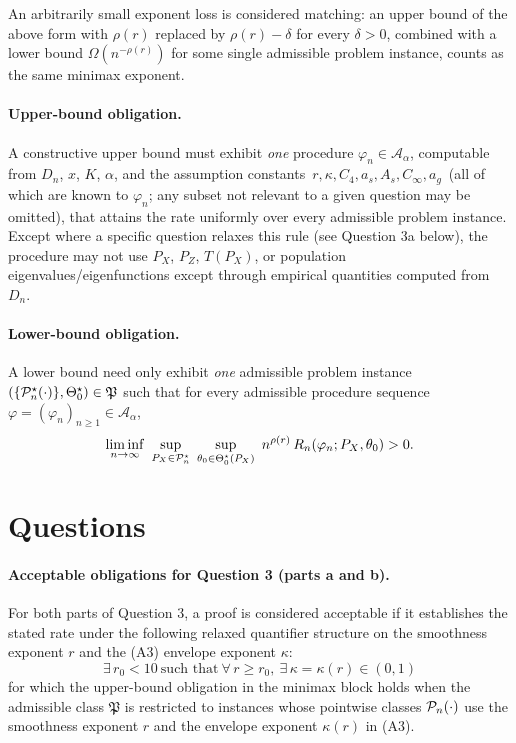 \documentclass{article}
\begin{document}
An arbitrarily small exponent loss is considered matching: an upper
bound of the above form with \(\rho(r)\) replaced by \(\rho(r)-\delta\)
for every \(\delta>0\), combined with a lower bound
\(\Omega(n^{-\rho(r)})\) for some single admissible problem instance,
counts as the same minimax exponent.

\paragraph{Upper-bound obligation.} A constructive upper bound must
exhibit \emph{one} procedure \(\varphi_n\in\mathcal A_\alpha\),
computable from \(D_n\), \(x\), \(K\), \(\alpha\), and the assumption
constants
\(\,r,\kappa,C_4,a_s,A_s,C_\infty,a_g\,\)
(all of which are known to \(\varphi_n\); any subset not relevant to a
given question may be omitted), that attains the rate uniformly over
every admissible problem instance. Except where a specific question
relaxes this rule (see Question 3a below), the procedure may not use
\(P_X\), \(P_Z\), \(T(P_X)\), or population eigenvalues/eigenfunctions
except through empirical quantities computed from \(D_n\).

\paragraph{Lower-bound obligation.} A lower bound need only exhibit
\emph{one} admissible problem instance
\((\{\mathcal P_n^\star(\cdot)\},\Theta_0^\star)\in\mathfrak P\) such that
for every admissible procedure sequence
\(\varphi=(\varphi_n)_{n\ge1}\in\mathcal A_\alpha\),
\[
  \liminf_{n\to\infty}\
  \sup_{P_X\in\mathcal P_n^\star}\
  \sup_{\theta_0\in\Theta_0^\star(P_X)}\
  n^{\rho(r)}\,
  R_n(\varphi_n;P_X,\theta_0)
  >0.
\]

\section{Questions}

\paragraph{Acceptable obligations for Question 3 (parts a and b).}
For both parts of Question 3, a proof is considered acceptable if it
establishes the stated rate under the following relaxed quantifier
structure on the smoothness exponent \(r\) and the (A3) envelope
exponent \(\kappa\):
\[
  \exists\,r_0<10\ \text{such that}\ \forall\,r\geq r_0,\
  \exists\,\kappa=\kappa(r)\in(0,1)
\]
for which the upper-bound obligation in the minimax block holds when
the admissible class \(\mathfrak P\) is restricted to instances whose
pointwise classes \(\mathcal P_n(\cdot)\) use the smoothness exponent \(r\) and
the envelope exponent \(\kappa(r)\) in (A3).
\end{document}
